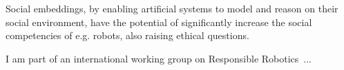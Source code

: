 Social embeddings, by enabling artificial systems to model and reason on their
social environment, have the potential of significantly increase the social
competencies of e.g. robots, also raising ethical questions.

\begin{rewrite}
I am part of an international working group on Responsible Robotics~...

%






\end{rewrite}
